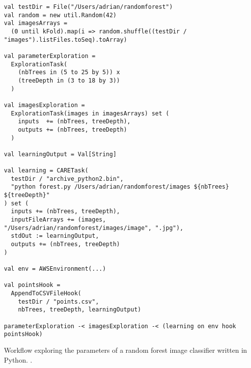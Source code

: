 \begin{appendices}
\begin{listing}[h]
\begin{minipage}{13.8cm}
\begin{verbatim}
val testDir = File("/Users/adrian/randomforest")
val random = new util.Random(42)
val imagesArrays = 
  (0 until kFold).map(i => random.shuffle((testDir / "images").listFiles.toSeq).toArray)

val parameterExploration = 
  ExplorationTask(
    (nbTrees in (5 to 25 by 5)) x
    (treeDepth in (3 to 18 by 3))
  )
  
val imagesExploration = 
  ExplorationTask(images in imagesArrays) set (
    inputs  += (nbTrees, treeDepth),
    outputs += (nbTrees, treeDepth)
  )

val learningOutput = Val[String]

val learning = CARETask(
  testDir / "archive_python2.bin",
  "python forest.py /Users/adrian/randomforest/images ${nbTrees} ${treeDepth}"
) set (
  inputs += (nbTrees, treeDepth),
  inputFileArrays += (images, "/Users/adrian/randomforest/images/image", ".jpg"),
  stdOut := learningOutput,
  outputs += (nbTrees, treeDepth)
)

val env = AWSEnvironment(...)

val pointsHook = 
  AppendToCSVFileHook(
    testDir / "points.csv",
    nbTrees, treeDepth, learningOutput)

parameterExploration -< imagesExploration -< (learning on env hook pointsHook)
		\end{verbatim}
	\end{minipage}
	\caption{Workflow exploring the parameters of a random forest image classifier written in Python. \cite{OpenMOLEMarketplace}.}
	\label{RandomForest}
\end{listing}

\end{appendices}